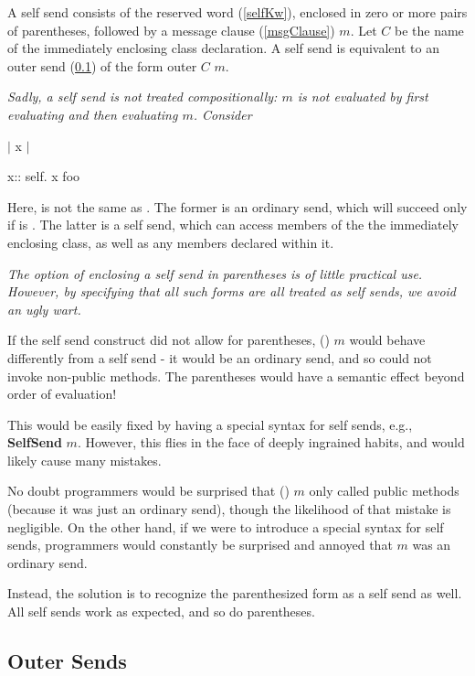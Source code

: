 \documentclass{article}
\newcommand{\code}[1]{{\sf #1}}
\begin{document}
A self send consists of the reserved word \SELF{ } (\ref{selfKw}), enclosed in zero or more pairs of parentheses, followed by a message clause  (\ref{msgClause}) $m$.  Let $C$ be the name of the immediately enclosing class declaration. A self send is equivalent to an outer send (\ref{out}) of the form \code{outer $C$ $m$}.

{\it
Sadly, a self send is not treated compositionally: \SELF{} $m$ is not evaluated by first evaluating \SELF{} and then evaluating $m$. 
Consider
\begin{newspeak}
$|$ x $|$

x:: self.
x foo
\end{newspeak}

Here,  is not the same as . The former is an ordinary send, which will succeed only if  is \PUBLIC.  The latter is a self send, which can access  \PROTECTED{} members
of the  the immediately enclosing class, as well as any \PRIVATE{} members declared within it.
}

{\it
The option of enclosing a self send in parentheses is of little practical use. However, by specifying that all such forms are all treated as self sends, we avoid an ugly wart.

If the self send construct did not allow for parentheses, (\SELF{}) $m$ would behave differently from a self send - it would be an ordinary send, and so could not invoke non-public methods. The parentheses would have a semantic effect beyond order of evaluation!  

This would be easily fixed by having a special syntax for self sends, e.g., \textbf{SelfSend} $m$. However, this flies in the face of deeply ingrained habits, and would likely cause many mistakes. 

No doubt programmers would be surprised that (\SELF{}) $m$ only called public methods (because it was just an ordinary send),  though the likelihood of that mistake is negligible. On the other hand, if we were to introduce a special syntax for self sends, programmers would constantly be surprised and annoyed that \SELF{} $m$ was an ordinary send.

Instead, the solution is to recognize the parenthesized form as a self send as well. All self sends work as expected, and so do parentheses.
}

\subsection{Outer Sends}
\label{out}
\end{document}
